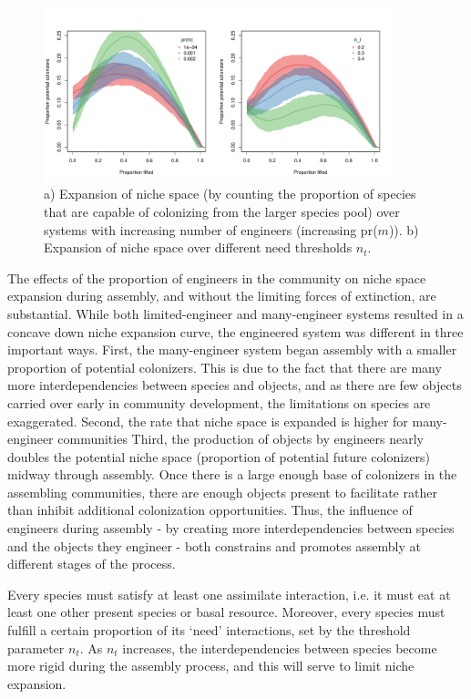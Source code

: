 \documentclass[twocolumn,preprintnumbers,amsmath,amssymb,superscriptaddress]{revtex4-1}
\begin{document}
\begin{figure}[ht]
\centering
\includegraphics[width=0.9\textwidth]{fig_potcol_comb.pdf}
\caption{
a) Expansion of niche space (by counting the proportion of species that are capable of colonizing from the larger species pool) over systems with increasing number of engineers (increasing pr($m$)). b) Expansion of niche space over different need thresholds $n_t$. 
}
\label{fig_potcol}
\end{figure} 

The effects of the proportion of engineers in the community on niche space expansion during assembly, and without the limiting forces of extinction, are substantial.
While both limited-engineer and many-engineer systems resulted in a concave down niche expansion curve, the engineered system was different in three important ways.
First, the many-engineer system began assembly with a smaller proportion of potential colonizers.
This is due to the fact that there are many more interdependencies between species and objects, and as there are few objects carried over early in community development, the limitations on species are exaggerated.
Second, the rate that niche space is expanded is higher for many-engineer communities
Third, the production of objects by engineers nearly doubles the potential niche space (proportion of potential future colonizers) midway through assembly.
Once there is a large enough base of colonizers in the assembling communities, there are enough objects present to facilitate rather than inhibit additional colonization opportunities.
Thus, the influence of engineers during assembly - by creating more interdependencies between species and the objects they engineer - both constrains and promotes assembly at different stages of the process.


Every species must satisfy at least one assimilate interaction, i.e. it must eat at least one other present species or basal resource.
Moreover, every species must fulfill a certain proportion of its `need' interactions, set by the threshold parameter $n_t$.
As $n_t$ increases, the interdependencies between species become more rigid during the assembly process, and this will serve to limit niche expansion.
\end{document}
